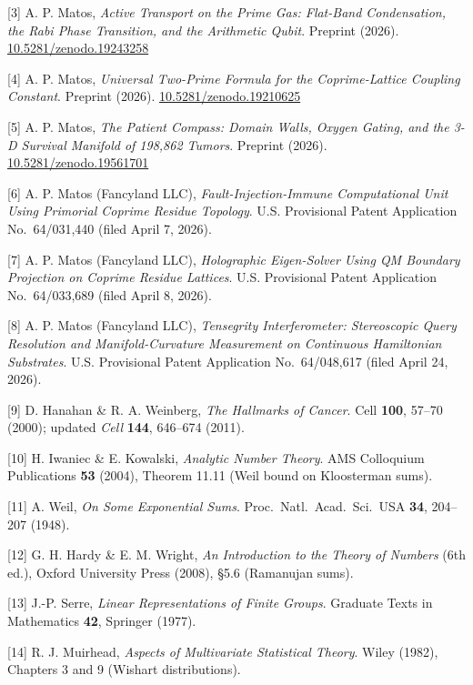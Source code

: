 \documentclass[
  11pt,
]{article}
\begin{document}
{[}3{]} A. P. Matos, \emph{Active Transport on the Prime Gas: Flat-Band
Condensation, the Rabi Phase Transition, and the Arithmetic Qubit}.
Preprint (2026).
\href{https://doi.org/10.5281/zenodo.19243258}{10.5281/zenodo.19243258}

{[}4{]} A. P. Matos, \emph{Universal Two-Prime Formula for the
Coprime-Lattice Coupling Constant}. Preprint (2026).
\href{https://doi.org/10.5281/zenodo.19210625}{10.5281/zenodo.19210625}

{[}5{]} A. P. Matos, \emph{The Patient Compass: Domain Walls, Oxygen
Gating, and the 3-D Survival Manifold of 198,862 Tumors}. Preprint
(2026).
\href{https://doi.org/10.5281/zenodo.19561701}{10.5281/zenodo.19561701}

{[}6{]} A. P. Matos (Fancyland LLC), \emph{Fault-Injection-Immune
Computational Unit Using Primorial Coprime Residue Topology}. U.S.
Provisional Patent Application No.~64/031,440 (filed April 7, 2026).

{[}7{]} A. P. Matos (Fancyland LLC), \emph{Holographic Eigen-Solver
Using QM Boundary Projection on Coprime Residue Lattices}. U.S.
Provisional Patent Application No.~64/033,689 (filed April 8, 2026).

{[}8{]} A. P. Matos (Fancyland LLC), \emph{Tensegrity Interferometer:
Stereoscopic Query Resolution and Manifold-Curvature Measurement on
Continuous Hamiltonian Substrates}. U.S. Provisional Patent Application
No.~64/048,617 (filed April 24, 2026).

{[}9{]} D. Hanahan \& R. A. Weinberg, \emph{The Hallmarks of Cancer}.
Cell \textbf{100}, 57--70 (2000); updated \emph{Cell} \textbf{144},
646--674 (2011).

{[}10{]} H. Iwaniec \& E. Kowalski, \emph{Analytic Number Theory}. AMS
Colloquium Publications \textbf{53} (2004), Theorem 11.11 (Weil bound on
Kloosterman sums).

{[}11{]} A. Weil, \emph{On Some Exponential Sums}.
Proc.~Natl.~Acad.~Sci.~USA \textbf{34}, 204--207 (1948).

{[}12{]} G. H. Hardy \& E. M. Wright, \emph{An Introduction to the
Theory of Numbers} (6th ed.), Oxford University Press (2008), §5.6
(Ramanujan sums).

{[}13{]} J.-P. Serre, \emph{Linear Representations of Finite Groups}.
Graduate Texts in Mathematics \textbf{42}, Springer (1977).

{[}14{]} R. J. Muirhead, \emph{Aspects of Multivariate Statistical
Theory}. Wiley (1982), Chapters 3 and 9 (Wishart distributions).
\end{document}
